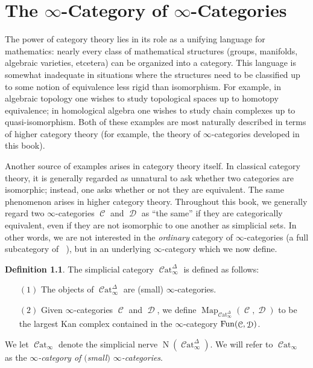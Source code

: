 \documentclass{report}[10pt, final]
\DeclareMathOperator{\Nerve}{N}
\DeclareMathOperator{\bHom}{{Map}}
\DeclareMathOperator{\sSet}{\mathcal{S}et_{\Delta}}
\DeclareMathOperator{\Cat}{\mathcal{C}at}
\DeclareMathOperator{\calC}{\mathcal{C}}
\DeclareMathOperator{\calD}{\mathcal{D}}
\theoremstyle{definition}
\newtheorem{definition}[theorem]{Definition}
\begin{document}
\chapter{The $\infty$-Category of $\infty$-Categories}\label{chap4}

\setcounter{theorem}{0}
\setcounter{subsection}{0}


The power of category theory lies in its role as a unifying language for mathematics: nearly every class of mathematical structures (groups, manifolds, algebraic varieties, etcetera) can be organized into a category. This language is somewhat inadequate in situations where the 
structures need to be classified up to some notion of equivalence less rigid than isomorphism. For example, in algebraic topology one wishes to study topological spaces up to homotopy equivalence; in homological algebra one wishes to study chain complexes up to quasi-isomorphism. Both of these examples are most naturally described in terms of higher category theory (for example, the theory of $\infty$-categories developed in this book).

Another source of examples arises in category theory itself. In classical category theory, it is generally regarded as unnatural to ask whether two categories are isomorphic; instead, one asks whether or not they are equivalent. The same phenomenon arises in higher category theory. Throughout this book, we generally regard two $\infty$-categories $\calC$ and $\calD$ as ``the same'' if they are categorically equivalent, even if they are not isomorphic to one another as simplicial sets. In other words, we are not interested in the {\em ordinary} category of $\infty$-categories (a full subcategory of $\sSet$), but in an underlying $\infty$-category which we now define.

\begin{definition}\index{not}{CatinftyD@$\Cat_{\infty}^{\Delta}$}\index{not}{Catinfty@$\Cat_{\infty}$}
The simplicial category $\Cat_{\infty}^{\Delta}$ is defined as follows:
\begin{itemize}
\item[$(1)$] The objects of $\Cat_{\infty}^{\Delta}$ are (small) $\infty$-categories.

\item[$(2)$] Given $\infty$-categories $\calC$ and $\calD$, we define $\bHom_{\Cat_{\infty}^{\Delta}}(\calC,\calD)$ to be the largest Kan complex contained in the $\infty$-category $\Fun(\calC, \calD)$.
\end{itemize}

We let $\Cat_{\infty}$ denote the simplicial nerve
$\Nerve(\Cat_{\infty}^{\Delta})$. We will refer to $\Cat_{\infty}$ as the {\it $\infty$-category
of $($small$)$ $\infty$-categories}.
\end{definition}
\end{document}
